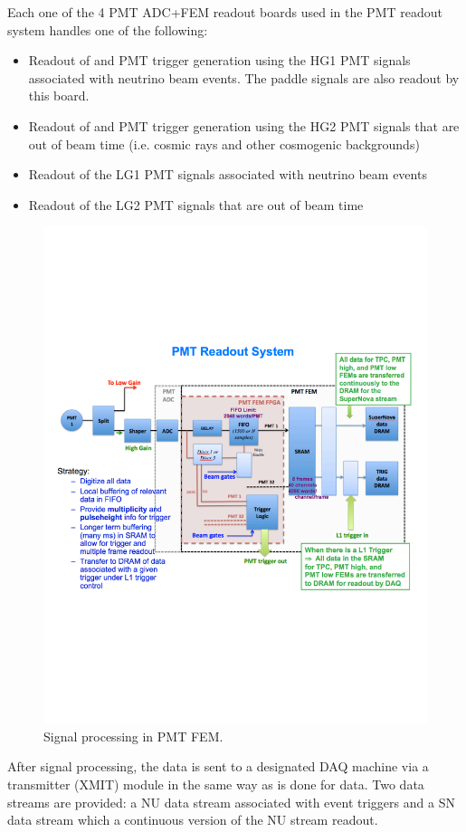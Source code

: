 Each one of the 4 PMT ADC+FEM readout boards used in the PMT readout system handles one of the following:

\begin{itemize}
\item Readout of and PMT trigger generation using the HG1 PMT signals associated with neutrino beam events. The paddle signals are also readout by this board. 
\item Readout of and PMT trigger generation using the HG2 PMT signals that are out of beam time (i.e. cosmic rays and other cosmogenic backgrounds) 
\item Readout of the LG1 PMT signals associated with neutrino beam events
\item Readout of the LG2 PMT signals that are out of beam time
\end{itemize}

\begin{figure}
\centering
\includegraphics[width=0.8\linewidth]{./figures/readout_7.pdf}%
\caption{\label{fig:readout_7}Signal processing in PMT FEM.}
\end{figure}

After signal processing, the data is sent to a designated DAQ machine via a transmitter (XMIT) module in the same way as is done for \lartpc data. Two data streams are provided: a NU data stream associated with event triggers and a SN data stream which a continuous version of the NU stream readout.

